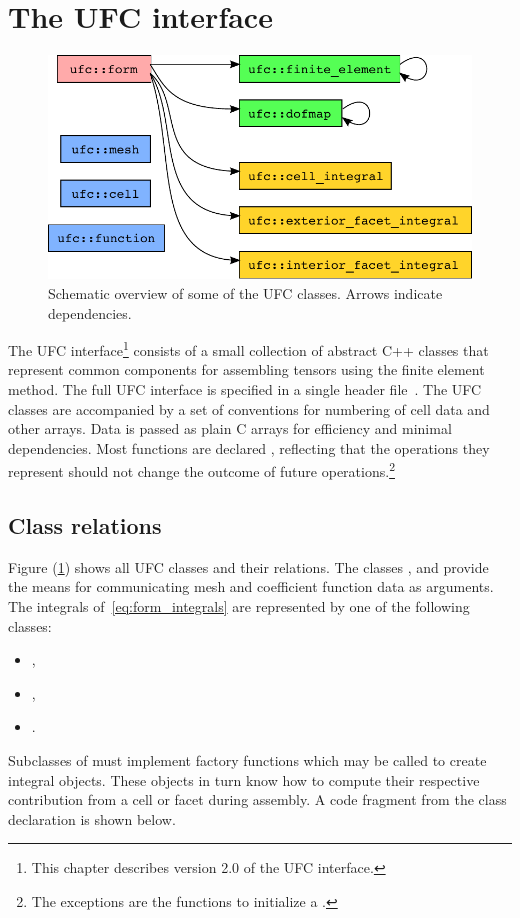 \section{The UFC interface}
\label{sec:alnes-2:ufc:syntax}

\begin{figure}
\bwfig
  \centering
  \includegraphics[width=\largefig]{chapters/alnes-2/pdf/ufc_classes.pdf}
  \caption{Schematic overview of some of the UFC classes. Arrows indicate dependencies.}
  \label{fig:uml}
\end{figure}

The UFC interface\footnote{This chapter describes version 2.0 of the
  UFC interface.} consists of a small collection of abstract C++
classes that represent common components for assembling tensors using
the finite element method. The full UFC interface is specified in a
single header file~. The UFC classes are accompanied by a
set of conventions for numbering of cell data and other arrays. Data
is passed as plain C arrays for efficiency and minimal dependencies.
Most functions are declared , reflecting that the
operations they represent should not change the outcome of future
operations.\footnote{The exceptions are the functions to initialize a
  .}

\subsection{Class relations}

Figure (\ref{fig:uml}) shows all UFC classes and their relations. The
classes ,  and  provide the means
for communicating mesh and coefficient function data as arguments.
The integrals of~\eqref{eq:form_integrals} are represented by one of
the following classes:
\begin{itemize}
\item
  ,
\item
  ,
\item
  .
\end{itemize}
Subclasses of  must implement factory functions which may be
called to create integral objects. These objects in turn know how to
compute their respective contribution from a cell or facet during
assembly. A code fragment from the  class declaration is
shown below.

